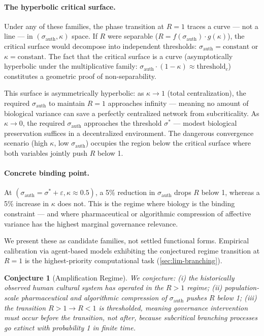 \documentclass[11pt, a4paper]{article}
\newtheorem{conjecture}{Conjecture}[section]
\theoremstyle{remark}
\begin{document}
\paragraph{The hyperbolic critical surface.} Under any of these families, the phase transition at $R = 1$ traces a curve --- not a line --- in $(\sigma_{\text{auth}}, \kappa)$ space. If $R$ were separable ($R = f(\sigma_{\text{auth}}) \cdot g(\kappa)$), the critical surface would decompose into independent thresholds: $\sigma_{\text{auth}} = \text{constant}$ or $\kappa = \text{constant}$. The fact that the critical surface is a curve (asymptotically hyperbolic under the multiplicative family: $\sigma_{\text{auth}} \cdot (1 - \kappa) \approx \text{threshold}_c$) constitutes a geometric proof of non-separability.

This surface is asymmetrically hyperbolic: as $\kappa \to 1$ (total centralization), the required $\sigma_{\text{auth}}$ to maintain $R = 1$ approaches infinity --- meaning no amount of biological variance can save a perfectly centralized network from subcriticality. As $\kappa \to 0$, the required $\sigma_{\text{auth}}$ approaches the threshold $\sigma^*$ --- modest biological preservation suffices in a decentralized environment. The dangerous convergence scenario (high $\kappa$, low $\sigma_{\text{auth}}$) occupies the region below the critical surface where both variables jointly push $R$ below 1.

\paragraph{Concrete binding point.} At $(\sigma_{\text{auth}} = \sigma^* + \varepsilon, \kappa \approx 0.5)$, a 5\% reduction in $\sigma_{\text{auth}}$ drops $R$ below 1, whereas a 5\% increase in $\kappa$ does not. This is the regime where biology is the binding constraint --- and where pharmaceutical or algorithmic compression of affective variance has the highest marginal governance relevance.

We present these as candidate families, not settled functional forms. Empirical calibration via agent-based models exhibiting the conjectured regime transition at $R = 1$ is the highest-priority computational task (\cref{sec:lim-branching}).

\begin{conjecture}[Amplification Regime]
We conjecture: (i) the historically observed human cultural system has operated in the $R > 1$ regime; (ii) population-scale pharmaceutical and algorithmic compression of $\sigma_{\text{auth}}$ pushes $R$ below 1; (iii) the transition $R > 1 \to R < 1$ is thresholded, meaning governance intervention must occur before the transition, not after, because subcritical branching processes go extinct with probability 1 in finite time.
\end{conjecture}
\end{document}
